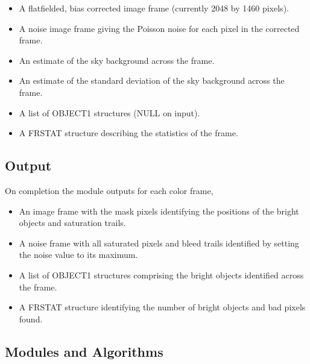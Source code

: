\begin{itemize}
 
\item A flatfielded, bias corrected image frame (currently 2048 by
1460 pixels).
 
\item A noise image frame giving the Poisson noise for each pixel in
the corrected frame.
 
\item An estimate of the sky background across the frame. 
 
\item An estimate of the standard deviation of the sky background
across the frame.  
 
\item A list of OBJECT1 structures (NULL on input).
 
\item A FRSTAT structure describing the statistics of the frame.
 
\end{itemize}
 
\subsection{Output}
 
On completion the \bom module outputs for each color frame,
 
\begin{itemize}
 
\item An image frame with the mask pixels identifying the positions of
the bright objects and saturation trails.
 
\item A noise frame with all saturated pixels and bleed trails
identified by setting the noise value to its maximum.
 
\item A list of OBJECT1 structures comprising the bright objects
identified across the frame.
 
\item A FRSTAT structure identifying the number of bright objects and
bad pixels found.
 
\end{itemize}
 
\subsection{Modules and Algorithms}
 
